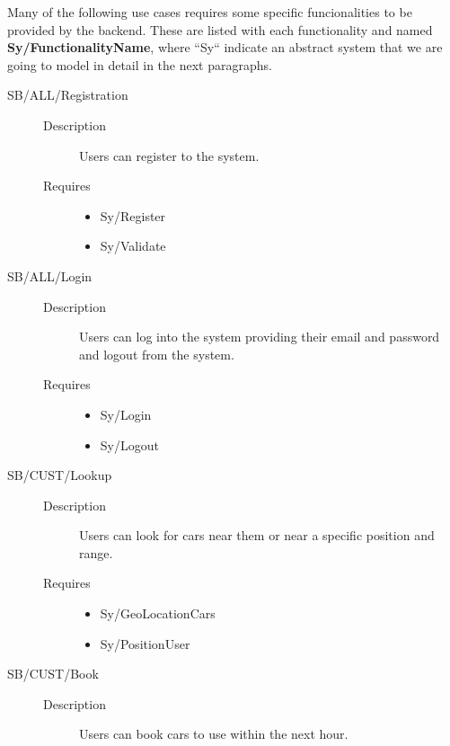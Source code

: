 \documentclass[11pt]{article} %
\begin{document}
Many of the following use cases requires some specific funcionalities to be provided by the backend. These are listed with each functionality and named \textbf{Sy/FunctionalityName}, where ``Sy`` indicate an abstract system that we are going to model in detail in the next paragraphs.

\begin{description}
	\item[SB/ALL/Registration] \hfill
	\begin{description}
		\item[Description] Users can register to the system.
		\item[Requires] \hfill
		\begin{itemize}
			\item Sy/Register %
			\item Sy/Validate %
		\end{itemize}
	\end{description}
	\item[SB/ALL/Login] \hfill
	\begin{description}
		\item[Description] Users can log into the system providing their email and password and logout from the system.
		\item[Requires] \hfill
		\begin{itemize}
			\item Sy/Login %
			\item Sy/Logout
		\end{itemize}
	\end{description}
	\item[SB/CUST/Lookup] \hfill
	\begin{description}
		\item[Description] Users can look for cars near them or near a specific position and range.
		\item[Requires] \hfill
		\begin{itemize}
			\item Sy/GeoLocationCars %
			\item Sy/PositionUser %
		\end{itemize}
	\end{description}
	\item[SB/CUST/Book] \hfill
	\begin{description}
		\item[Description] Users can book cars to use within the next hour.

\end{description}
\end{description}
\end{document}
